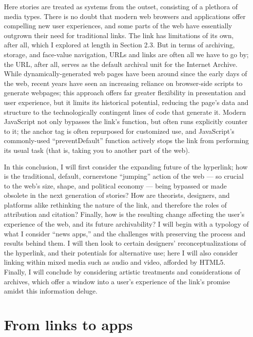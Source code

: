 Here stories are treated as systems from the outset, consisting of a plethora of media types. There is no doubt that modern web browsers and applications offer compelling new user experiences, and some parts of the web have essentially outgrown their need for traditional links. The link has limitations of its own, after all, which I explored at length in Section 2.3. But in terms of archiving, storage, and face-value navigation, URLs and links are often all we have to go by; the URL, after all, serves as the default archival unit for the Internet Archive. While dynamically-generated web pages have been around since the early days of the web, recent years have seen an increasing reliance on browser-side scripts to generate webpages; this approach offers far greater flexibility in presentation and user experience, but it limits its historical potential, reducing the page's data and structure to the technologically contingent lines of code that generate it. Modern JavaScript not only bypasses the link's function, but often runs explicitly counter to it; the anchor tag is often repurposed for customized use, and JavaScript's commonly-used ``preventDefault'' function actively stops the link from performing its usual task (that is, taking you to another part of the web).

In this conclusion, I will first consider the expanding future of the hyperlink; how is the traditional, default, cornerstone ``jumping'' action of the web --- so crucial to the web's size, shape, and political economy --- being bypassed or made obsolete in the next generation of stories? How are theorists, designers, and platforms alike rethinking the nature of the link, and therefore the roles of attribution and citation? Finally, how is the resulting change affecting the user's experience of the web, and its future archivability? I will begin with a typology of what I consider ``news apps,'' and the challenges with preserving the process and results behind them. I will then look to certain designers' reconceptualizations of the hyperlink, and their potentials for alternative use; here I will also consider linking within mixed media such as audio and video, afforded by HTML5. Finally, I will conclude by considering artistic treatments and considerations of archives, which offer a window into a user's experience of the link's promise amidst this information deluge.


\section{From links to apps}

